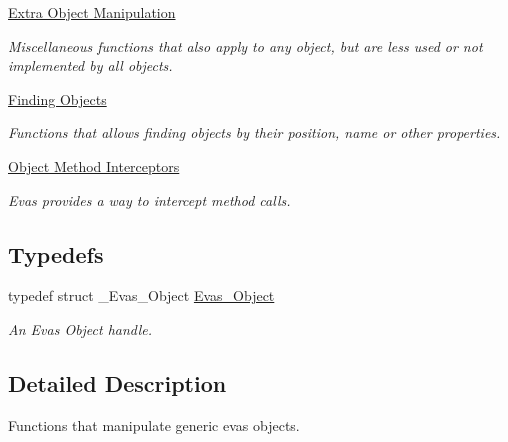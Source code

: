 \begin{DoxyCompactItemize}
\item 
\hyperlink{group__Evas__Object__Group__Extras}{Extra Object Manipulation}


\begin{DoxyCompactList}\small\item\em Miscellaneous functions that also apply to any object, but are less used or not implemented by all objects. \item\end{DoxyCompactList}

\item 
\hyperlink{group__Evas__Object__Group__Find}{Finding Objects}


\begin{DoxyCompactList}\small\item\em Functions that allows finding objects by their position, name or other properties. \item\end{DoxyCompactList}

\item 
\hyperlink{group__Evas__Object__Group__Interceptors}{Object Method Interceptors}


\begin{DoxyCompactList}\small\item\em Evas provides a way to intercept method calls. \item\end{DoxyCompactList}

\end{DoxyCompactItemize}
\subsection*{Typedefs}
\begin{DoxyCompactItemize}
\item 
typedef struct \_\-Evas\_\-Object \hyperlink{group__Evas__Object__Group_ga9e19e6dd1f517a0ba437c0114d3e7c97}{Evas\_\-Object}\label{group__Evas__Object__Group_ga9e19e6dd1f517a0ba437c0114d3e7c97}

\begin{DoxyCompactList}\small\item\em An Evas Object handle. \item\end{DoxyCompactList}\end{DoxyCompactItemize}


\subsection{Detailed Description}
Functions that manipulate generic evas objects. 